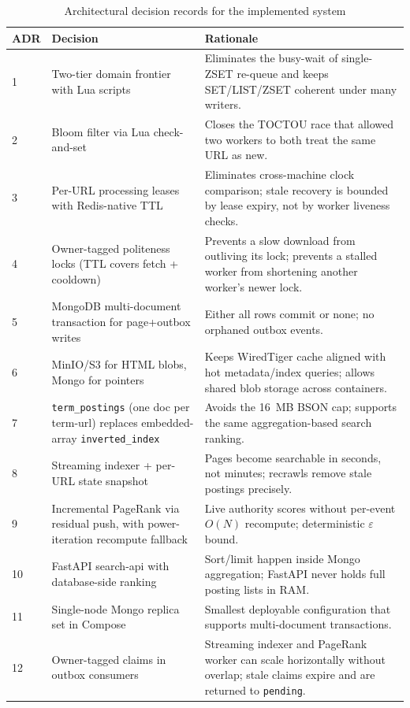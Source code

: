 \documentclass[11pt,a4paper]{article}
\newcommand{\code}[1]{\texttt{#1}}
\begin{document}
\begin{table}[H]
\centering
\caption{Architectural decision records for the implemented system}
\begin{tabular}{p{}p{}p{}}
\toprule
ADR & Decision & Rationale \\
\midrule
1 & Two-tier domain frontier with Lua scripts & Eliminates the busy-wait of single-ZSET re-queue and keeps SET/LIST/ZSET coherent under many writers.\\
2 & Bloom filter via Lua check-and-set & Closes the TOCTOU race that allowed two workers to both treat the same URL as new.\\
3 & Per-URL processing leases with Redis-native TTL & Eliminates cross-machine clock comparison; stale recovery is bounded by lease expiry, not by worker liveness checks.\\
4 & Owner-tagged politeness locks (TTL covers fetch + cooldown) & Prevents a slow download from outliving its lock; prevents a stalled worker from shortening another worker's newer lock.\\
5 & MongoDB multi-document transaction for page+outbox writes & Either all rows commit or none; no orphaned outbox events.\\
6 & MinIO/S3 for HTML blobs, Mongo for pointers & Keeps WiredTiger cache aligned with hot metadata/index queries; allows shared blob storage across containers.\\
7 & \code{term\_postings} (one doc per term-url) replaces embedded-array \code{inverted\_index} & Avoids the 16~MB BSON cap; supports the same aggregation-based search ranking.\\
8 & Streaming indexer + per-URL state snapshot & Pages become searchable in seconds, not minutes; recrawls remove stale postings precisely.\\
9 & Incremental PageRank via residual push, with power-iteration recompute fallback & Live authority scores without per-event $O(N)$ recompute; deterministic $\varepsilon$ bound.\\
10 & FastAPI search-api with database-side ranking & Sort/limit happen inside Mongo aggregation; FastAPI never holds full posting lists in RAM.\\
11 & Single-node Mongo replica set in Compose & Smallest deployable configuration that supports multi-document transactions.\\
12 & Owner-tagged claims in outbox consumers & Streaming indexer and PageRank worker can scale horizontally without overlap; stale claims expire and are returned to \code{pending}.\\
\bottomrule
\end{tabular}
\end{table}
\end{document}
